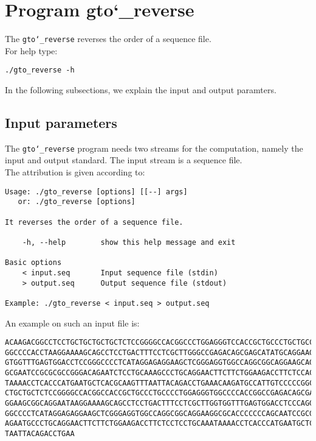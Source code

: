 \section{Program gto\char`_reverse}
The \texttt{gto\char`_reverse} reverses the order of a sequence file.\\
For help type:
\begin{lstlisting}
./gto_reverse -h
\end{lstlisting}
In the following subsections, we explain the input and output paramters.

\subsection*{Input parameters}

The \texttt{gto\char`_reverse} program needs two streams for the computation,
namely the input and output standard. The input stream is a sequence file.\\
The attribution is given according to:
\begin{lstlisting}
Usage: ./gto_reverse [options] [[--] args]
   or: ./gto_reverse [options]

It reverses the order of a sequence file.

    -h, --help        show this help message and exit

Basic options
    < input.seq       Input sequence file (stdin)
    > output.seq      Output sequence file (stdout)

Example: ./gto_reverse < input.seq > output.seq
\end{lstlisting}
An example on such an input file is:
\begin{lstlisting}
ACAAGACGGCCTCCTGCTGCTGCTGCTCTCCGGGGCCACGGCCCTGGAGGGTCCACCGCTGCCCTGCTGCCATTGTCCCC
GGCCCCACCTAAGGAAAAGCAGCCTCCTGACTTTCCTCGCTTGGGCCGAGACAGCGAGCATATGCAGGAAGCGGCAGGAA
GTGGTTTGAGTGGACCTCCGGGCCCCTCATAGGAGAGGAAGCTCGGGAGGTGGCCAGGCGGCAGGAAGCAGGCCAGTGCC
GCGAATCCGCGCGCCGGGACAGAATCTCCTGCAAAGCCCTGCAGGAACTTCTTCTGGAAGACCTTCTCCACCCCCCCAGC
TAAAACCTCACCCATGAATGCTCACGCAAGTTTAATTACAGACCTGAAACAAGATGCCATTGTCCCCCGGCCTCCTGCTG
CTGCTGCTCTCCGGGGCCACGGCCACCGCTGCCCTGCCCCTGGAGGGTGGCCCCACCGGCCGAGACAGCGAGCATATGCA
GGAAGCGGCAGGAATAAGGAAAAGCAGCCTCCTGACTTTCCTCGCTTGGTGGTTTGAGTGGACCTCCCAGGCCAGTGCCG
GGCCCCTCATAGGAGAGGAAGCTCGGGAGGTGGCCAGGCGGCAGGAAGGCGCACCCCCCCAGCAATCCGCGCGCCGGGAC
AGAATGCCCTGCAGGAACTTCTTCTGGAAGACCTTCTCCTCCTGCAAATAAAACCTCACCCATGAATGCTCACGCAAGTT
TAATTACAGACCTGAA
\end{lstlisting}

